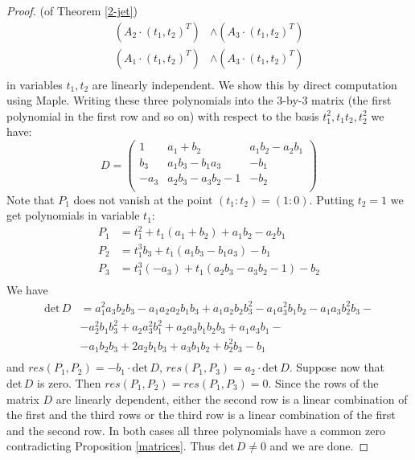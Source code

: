 \documentclass[a4paper]{amsart}
\theoremstyle{plain}
\theoremstyle{definition}
\begin{document}
\begin{proof}{(of Theorem \ref{2-jet})}
\begin{align*}
    (A_2 \cdot (t_1, t_2)^T) &\wedge (A_3 \cdot (t_1, t_2)^T)\\
    (A_1 \cdot (t_1, t_2)^T) &\wedge (A_3 \cdot (t_1, t_2)^T)\\
    \end{align*}
    in variables $t_1, t_2$ are linearly independent.
    We show this by direct computation using Maple.
    Writing these three polynomials into the $3$-by-$3$ matrix (the first polynomial in the first row and so on) with respect to the basis $t_1^2, t_1 t_2, t_2^2$ we have:
    \begin{equation*}
        D =\begin{pmatrix}
            1&a_1 + b_2 &a_1 b_2 - a_2 b_1  \\
            b_3&a_1 b_3 - b_1 a_3&-b_1      \\
            -a_3& a_2 b_3 - a_3 b_2 -1&-b_2 \\
        \end{pmatrix}
    \end{equation*}
    Note that $P_1$ does not vanish at the point $(t_1\colon t_2) = (1\colon 0)$. Putting $t_2 = 1$ we get polynomials in variable $t_1$:
    \begin{align*}
        P_1 &= t_1^2 + t_1(a_1 +b_2) + a_1 b_2 - a_2 b_1\\
        P_2 &= t_1^3 b_3 + t_1 (a_1 b_3 - b_1 a_3) - b_1\\
        P_3 &= t_1^3 (-a_3) +t_1(a_2 b_3 - a_3 b_2 -1) - b_2\\
    \end{align*}
    We have
    \begin{align*}
        \mathrm{det}\, D &= a_1^2 a_3 b_2 b_3 - a_1 a_2 a_2 b_1 b_3 + a_1 a_2 b_2 b_3^2 - a_1 a_3^2 b_1 b_2 - a_1 a_3 b_2^2 b_3 -\\
        &- a_2^2 b_1 b_3^2+a_2 a_3^2 b_1^2 + a_2 a_3 b_1 b_2 b_3 + a_1 a_3 b_1 -\\
        &-a_1 b_2 b_3 + 2 a_2 b_1 b_3 + a_3 b_1 b_2 + b_2^2 b_3 - b_1\\
    \end{align*}
    and $res(P_1, P_2) = -b_1 \cdot \mathrm{det} \, D$, $res(P_1, P_3) = a_2 \cdot \mathrm{det}\, D$. %
    Suppose now that $\mathrm{det}\, D$ is zero. Then $res(P_1, P_2) = res(P_1, P_3) = 0$.
    Since the rows of the matrix $D$ are linearly dependent, either the second row is a linear combination of the first and the third rows or the third row is a linear combination of the first and the second row.
    In both cases all three polynomials have a common zero contradicting Proposition \ref{matrices}.
    Thus $\mathrm{det}\, D \neq 0$ and we are done.
\end{proof}
\end{document}
